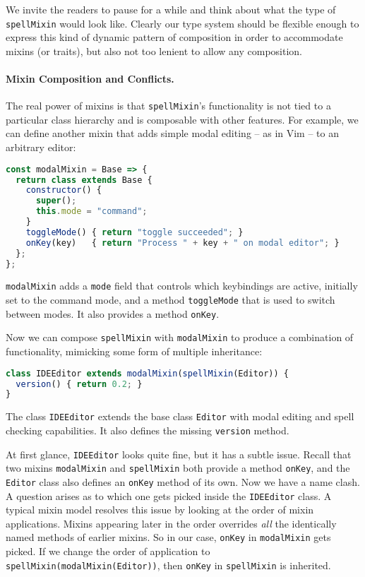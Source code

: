 

We invite the readers to pause for a while and think about what the type of
\lstinline{spellMixin} would look like. Clearly our type system should be
flexible enough to express this kind of dynamic pattern of composition in order
to accommodate mixins (or traits), but also not too lenient to allow any
composition.


\paragraph{Mixin Composition and Conflicts.}
The real power of mixins is that \lstinline{spellMixin}'s functionality is not
tied to a particular class hierarchy and is composable with other features. For
example, we can define another mixin that adds simple modal editing -- as in Vim
-- to an arbitrary editor:
\begin{lstlisting}[language=JavaScript]
const modalMixin = Base => {
  return class extends Base {
    constructor() {
      super();
      this.mode = "command";
    }
    toggleMode() { return "toggle succeeded"; }
    onKey(key)   { return "Process " + key + " on modal editor"; }
  };
};
\end{lstlisting}
\lstinline{modalMixin} adds a \lstinline{mode} field that controls which
keybindings are active, initially set to the command mode, and a method
\lstinline{toggleMode} that is used to switch between modes. It also provides a method \lstinline{onKey}.

Now we can compose \lstinline{spellMixin} with \lstinline{modalMixin} to produce
a combination of functionality, mimicking some form of multiple inheritance:
\begin{lstlisting}[language=JavaScript]
class IDEEditor extends modalMixin(spellMixin(Editor)) {
  version() { return 0.2; }
}
\end{lstlisting}
The class \lstinline{IDEEditor} extends the base class \lstinline{Editor} with
modal editing and spell checking capabilities. It also defines the missing
\lstinline{version} method.

At first glance, \lstinline{IDEEditor} looks quite fine, but it has a subtle
issue. Recall that two mixins \lstinline{modalMixin} and \lstinline{spellMixin}
both provide a method \lstinline{onKey}, and the \lstinline{Editor} class also
defines an \lstinline{onKey} method of its own. Now we have a name clash. A
question arises as to which one gets picked inside the \lstinline{IDEEditor}
class. A typical mixin model resolves this issue by looking at the order of mixin applications. Mixins appearing later in the order
overrides \emph{all} the identically named methods of earlier mixins. So in our
case, \lstinline{onKey} in \lstinline{modalMixin} gets picked. If we
change the order of application to \lstinline{spellMixin(modalMixin(Editor))},
then \lstinline{onKey} in \lstinline{spellMixin} is inherited.

